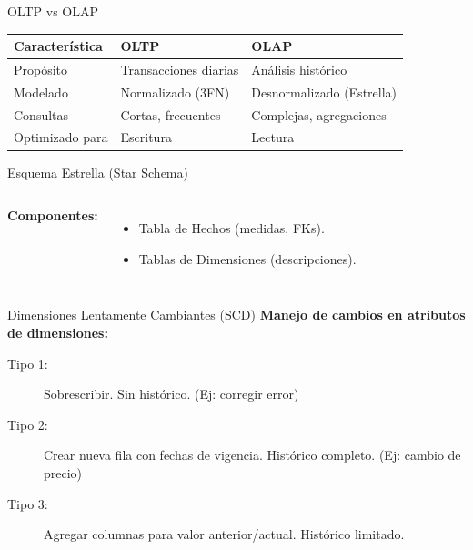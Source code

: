\documentclass[aspectratio=169, 10pt, xcolor=table]{beamer}
\begin{document}
\begin{frame}{OLTP vs OLAP}
    \begin{table}
        \centering
        \begin{tabular}{l|l|l}
            \toprule
            Característica & OLTP & OLAP \\
            \midrule
            Propósito & Transacciones diarias & Análisis histórico \\
            Modelado & Normalizado (3FN) & Desnormalizado (Estrella) \\
            Consultas & Cortas, frecuentes & Complejas, agregaciones \\
            Optimizado para & Escritura & Lectura \\
            \bottomrule
        \end{tabular}
    \end{table}
\end{frame}

\begin{frame}{Esquema Estrella (Star Schema)}
    \begin{columns}[t]
        \textbf{Componentes:}
        \begin{itemize}
            \item Tabla de Hechos (medidas, FKs).
            \item Tablas de Dimensiones (descripciones).
        \end{itemize}
        \centering
    \end{columns}
\end{frame}

\begin{frame}{Dimensiones Lentamente Cambiantes (SCD)}
    \textbf{Manejo de cambios en atributos de dimensiones:}
    \begin{description}
        \item[Tipo 1:] Sobrescribir. Sin histórico. (Ej: corregir error)
        \item[Tipo 2:] Crear nueva fila con fechas de vigencia. Histórico completo. (Ej: cambio de precio)
        \item[Tipo 3:] Agregar columnas para valor anterior/actual. Histórico limitado.
    \end{description}
\end{frame}
\end{document}
